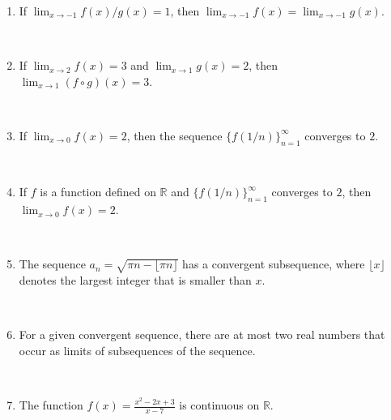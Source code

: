 \documentclass[12pt]{amsart}
\newcommand{\R}{{\mathbb{R}}}
\numberwithin{equation}{section}
\theoremstyle{plain} %
\theoremstyle{definition}
\theoremstyle{remark}
\begin{document}
\begin{enumerate}
	

	\item  If $\lim_{x\to -1} f(x)/g(x) =1$, then $\lim_{x\to -1} f(x)=\lim_{x\to -1} g(x)$.
		
	\
	


	

	 
	 

	 

 
 \item  If $\lim_{x\to 2} f(x) = 3$ and $\lim_{x\to 1} g(x) =2$, then $\lim_{x\to 1} (f \circ g)(x) = 3$.


\
 

 
 	  \item  If $\lim_{x\to 0} f(x)=2$, then the sequence $\{ f(1/n) \}_{n=1}^\infty$ converges to $2$.
 
 \
 
 \item  If $f$ is a function defined on $\R$ and $\{ f(1/n) \}_{n=1}^\infty$ converges to $2$, then
 ${\lim_{x\to 0} f(x)=2}$.
 
 \
 

	
	
	 
 
 \item  The sequence $a_n =\sqrt{\pi n - \lfloor \pi n\rfloor}$ has a convergent subsequence, where $\lfloor x \rfloor$ denotes the largest integer that is smaller than $x$.
 
 \
 

 
 \item  For a given convergent sequence,  there are at most two real numbers that occur as limits of subsequences of the sequence.
 
 \

 
	 
	 \item  The function $f(x) = \frac{x^2 - 2x + 3}{x-7}$ is continuous on $\R$.
	 
	 \
	 


\end{enumerate}
\end{document}
